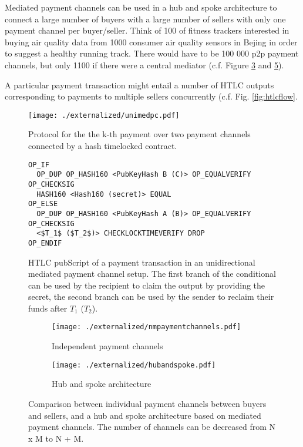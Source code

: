 Mediated payment channels can be used in a hub and spoke architecture to connect a large number of buyers with a large number of sellers with only one payment channel per buyer/seller. Think of 100 of fitness trackers interested in buying air quality data from 1000 consumer air quality sensors in Bejing in order to suggest a healthy running track. There would have to be 100 000 p2p payment channels, but only 1100 if there were a central mediator (c.f. Figure \ref{fig:nmpaymentchannels} and \ref{fig:hubandspoke}).


A particular payment transaction might entail a number of HTLC outputs corresponding to payments to multiple sellers concurrently (c.f. Fig. \ref{fig:htlcflow}.

\begin{figure}
\centering
\texttt{[image: ./externalized/unimedpc.pdf]}
\caption{Protocol for the the k-th payment over two payment channels connected by a hash timelocked contract.}
\label{fig:unimedpc}
\end{figure}

\begin{figure}
\begin{lstlisting}[breaklines,mathescape=true]
OP_IF
  OP_DUP OP_HASH160 <PubKeyHash B (C)> OP_EQUALVERIFY OP_CHECKSIG
  HASH160 <Hash160 (secret)> EQUAL
OP_ELSE
  OP_DUP OP_HASH160 <PubKeyHash A (B)> OP_EQUALVERIFY OP_CHECKSIG
  <$T_1$ ($T_2$)> CHECKLOCKTIMEVERIFY DROP
OP_ENDIF
\end{lstlisting} 
\caption{HTLC pubScript of a payment transaction in an unidirectional mediated payment channel setup. The first branch of the conditional can be used by the recipient to claim the output by providing the secret, the second branch can be used by the sender to reclaim their funds after $T_1$ ($T_2$).}
\label{fig:pubScriptHTLC}
\end{figure}



\begin{figure}[ht]
  \centering
  \begin{subfigure}[t]{0.5\linewidth}
    \centering\texttt{[image: ./externalized/nmpaymentchannels.pdf]}
    \caption{Independent payment channels\label{fig:nmpaymentchannels}}
  \end{subfigure}%
  \begin{subfigure}[t]{0.5\linewidth}
    \centering\texttt{[image: ./externalized/hubandspoke.pdf]}
    \caption{Hub and spoke architecture\label{fig:hubandspoke}}
  \end{subfigure}
  \caption{Comparison between individual payment channels between buyers and sellers, and a hub and spoke architecture based on mediated payment channels. The number of channels can be decreased from N x M to N + M.}
\end{figure}


